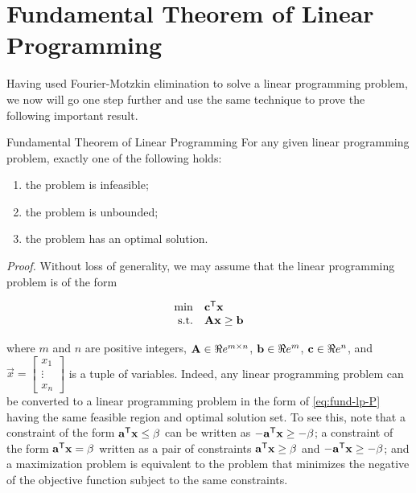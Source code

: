 %

\section{Fundamental Theorem of Linear
Programming}\label{fundamental-theorem-of-linear-programming}

Having used Fourier-Motzkin elimination to solve a linear programming
problem, we now will go one step further and use the same technique to
prove the following important result.

\begin{theorem}{Fundamental Theorem of Linear Programming}{}
\protect\hypertarget{thm:fund-lp}{}{\label{thm:fund-lp}
\iffalse (Fundamental Theorem of Linear Programming) \fi{} }For any
given linear programming problem, exactly one of the following holds:

\begin{enumerate}
\def\labelenumi{\arabic{enumi}.}
\item
  the problem is infeasible;
\item
  the problem is unbounded;
\item
  the problem has an optimal solution.
\end{enumerate}
\end{theorem}

\emph{Proof.} Without loss of generality, we may assume that the linear
programming problem is of the form

\begin{equation}
\begin{array}{rl}
\min & \mathbf{c}^{\mathsf{T}} \mathbf{x}  \\
\mbox{s.t.} & \mathbf{A} \mathbf{x} \geq \mathbf{b}
\label{eq:fund-lp-P}
\end{array}
\end{equation}

where \(m\) and \(n\) are positive integers,
\(\mathbf{A} \in \Re e^{m\times n}\), \(\mathbf{b} \in \Re e^m\),
\(\mathbf{c} \in \Re e^n\), and
\(\vec{x}= \begin{bmatrix} x_1\\\vdots \\ x_n\end{bmatrix}\) is a tuple
of variables. Indeed, any linear programming problem can be converted to
a linear programming problem in the form of \eqref{eq:fund-lp-P} having
the same feasible region and optimal solution set. To see this, note
that a constraint of the form \(\mathbf{a}^{\mathsf{T}} \mathbf{x} \leq \beta\) can
be written as \(-\mathbf{a}^{\mathsf{T}} \mathbf{x} \geq -\beta\); a constraint of
the form \(\mathbf{a}^{\mathsf{T}} \mathbf{x} = \beta\) written as a pair of
constraints \(\mathbf{a}^{\mathsf{T}} \mathbf{x} \geq \beta\) and
\(-\mathbf{a}^{\mathsf{T}} \mathbf{x} \geq -\beta\); and a maximization problem is
equivalent to the problem that minimizes the negative of the objective
function subject to the same constraints.

